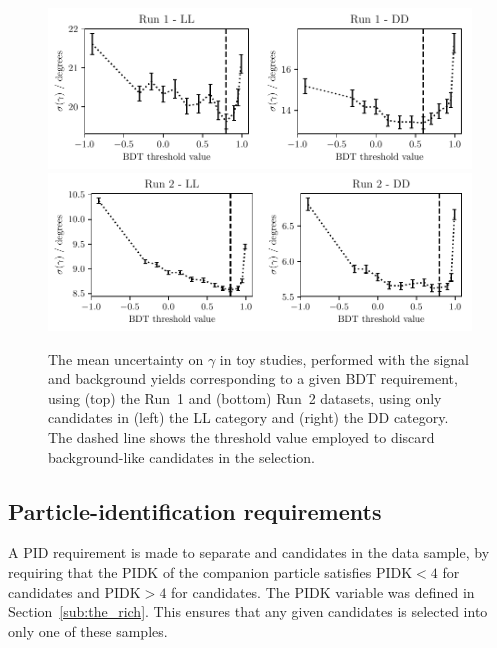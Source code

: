 \begin{figure}[tb]
    \centering
    \includegraphics[width=0.85\columnwidth]{figures/analysis/bdt_gamma_scan_Run1_thesis.pdf}
    \includegraphics[width=0.85\columnwidth]{figures/analysis/bdt_gamma_scan_Run2_thesis.pdf}
    \caption{The mean uncertainty on $\gamma$ in toy studies, performed with the signal and background yields corresponding to a given BDT requirement, using (top) the Run~1 and (bottom) Run~2 datasets, using only candidates in (left) the LL category and (right) the DD category. The dashed line shows the threshold value employed to discard background-like candidates in the selection.}
    \label{fig:bdt_gamma_scan}
\end{figure}


\subsection{Particle-identification requirements} %
\label{sub:particle_identification_requirements}

A PID requirement is made to separate \BtoDK and \BtoDpi candidates in the data sample, by requiring that the PIDK of the companion particle satisfies $\textrm{PIDK} < 4$ for \BtoDpi candidates and $\textrm{PIDK} > 4$ for \BtoDK candidates. The PIDK variable was defined in Section~\ref{sub:the_rich}. This ensures that any given candidates is selected into only one of these samples.

